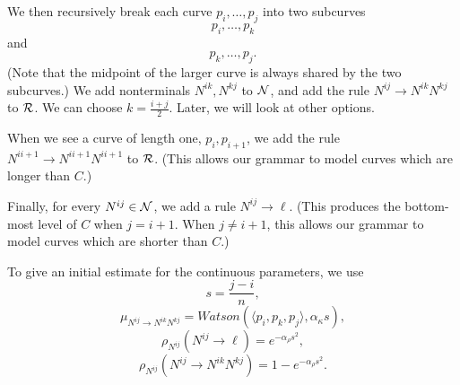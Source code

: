\documentclass{article}
\newcommand\fakecite[1]{ {\bf [#1]} }
\begin{document}
We then recursively break each curve $p_i,\dots,p_j$
into two subcurves 
$$p_i, \dots, p_k$$
and
$$p_k, \dots, p_j.$$ 
(Note that the midpoint of the larger curve is always shared by the
two subcurves.)  We add nonterminals $N^{ik}, N^{kj}$ to ${\mathcal N}$, and
add the rule $N^{ij} \to N^{ik} N^{kj}$ to ${\mathcal R}$.  We can choose
$k=\frac{i+j}{2}$. Later, we will look at other options.

When we see a curve of length one, $p_i,  p_{i+1}$, we add the rule
$N^{i i+1} \to N^{i i+1} N^{i i+1}$ to ${\mathcal R}$. (This allows our grammar
to model curves which are longer than $C$.)

Finally, for every $N^{ij} \in {\mathcal N}$, we add a rule $N^{ij} \to \ell$.
(This produces the bottom-most level of $C$ when $j=i+1$. When $j\ne
i+1$, this allows our grammar to model curves which are shorter than
$C$.)

To give an initial estimate for the continuous parameters, we use
$$s = \frac{j-i}{n},$$
$$\mu_{ N^{ij} \to N^{ik} N^{kj} } = Watson(\langle p_i, p_k,
p_j\rangle, \alpha_\kappa s),$$
$$\rho_{N^{ij}} (N^{ij}\to \ell) = e^{- \alpha_\rho s^2},$$
$$\rho_{N^{ij}} (N^{ij}\to N^{ik}N^{kj}) = 1 - e^{-\alpha_\rho s^2}.$$



\end{document}
